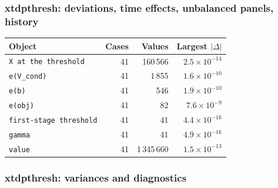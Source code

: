 \documentclass[
  10.5pt,
  a4paper,
]{article}
\begin{document}
\subsubsection*{xtdpthresh: deviations, time effects, unbalanced panels, history}

\begin{longtable}{@{}p{8.2cm}rrr@{}}
\toprule
Object & Cases & Values & Largest $|\Delta|$ \\
\midrule
\endhead
\texttt{X at the threshold} & 41 & 160\,566 & $2.5\times10^{-14}$ \\
\texttt{e(V\_\allowbreak{}cond)} & 41 & 1\,855 & $1.6\times10^{-10}$ \\
\texttt{e(b)} & 41 & 546 & $1.9\times10^{-10}$ \\
\texttt{e(obj)} & 41 & 82 & $7.6\times10^{-9}$ \\
\texttt{first-stage threshold} & 41 & 41 & $4.4\times10^{-16}$ \\
\texttt{gamma} & 41 & 41 & $4.9\times10^{-16}$ \\
\texttt{value} & 41 & 1\,345\,660 & $1.5\times10^{-13}$ \\
\bottomrule
\end{longtable}

\subsubsection*{xtdpthresh: variances and diagnostics}
\end{document}

